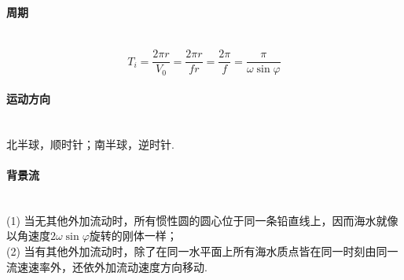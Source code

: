 \documentclass[a4paper,12pt]{article}
\begin{document}
    \paragraph{周期}~{}
     \[
        T_{i}=\frac{2 \pi r}{V_{0}}=\frac{2 \pi r}{f r}=\frac{2 \pi}{f}=\frac{\pi}{\omega \sin \varphi}
     \]
     \paragraph{运动方向}~{}\\
     北半球，顺时针；南半球，逆时针.
    \paragraph{背景流}~{}\\
    (1) 当无其他外加流动时，所有惯性圆的圆心位于同一条铅直线上，因而海水就像以角速度$2\omega \sin \varphi$旋转的刚体一样；\\
    (2) 当有其他外加流动时，除了在同一水平面上所有海水质点皆在同一时刻由同一流速速率外，还依外加流动速度方向移动.

    
	
\end{document}
